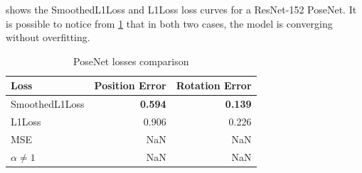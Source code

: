  shows the SmoothedL1Loss and L1Loss loss curves for a ResNet-152 PoseNet. It is possible to notice from \cref{tab:posenet-losses} that in both two cases, the model is converging without overfitting.

\begin{table}[htbp]
    \caption{PoseNet losses comparison}
    \begin{center}
        \begin{tabular}{lrr}
            \toprule
            Loss            & {Position Error} & {Rotation Error} \\
            \midrule
            SmoothedL1Loss  & \textbf{0.594}   & \textbf{0.139}   \\
            L1Loss          & 0.906            & 0.226            \\
            MSE             & NaN              & NaN              \\
            $\alpha \neq 1$ & NaN              & NaN              \\
            \bottomrule
        \end{tabular}
        \label{tab:posenet-losses}
    \end{center}
\end{table}

